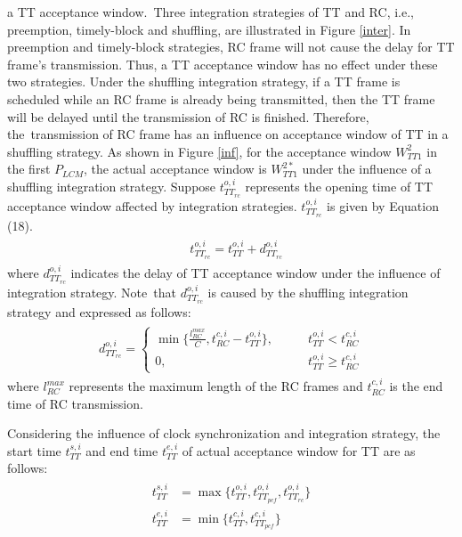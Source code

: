 \documentclass[electronics,article,accept,moreauthors,pdftex]{Definitions/mdpi}
\begin{document}
 a TT acceptance window.~Three integration strategies of TT and RC, i.e.,  preemption, timely-block and shuffling, are illustrated in {Figure} \ref{inter}. In preemption and timely-block strategies, RC frame will not cause the delay for TT frame's transmission. Thus, a TT acceptance window has no effect under these two strategies. Under the shuffling integration strategy, if a TT frame is scheduled while an RC frame is already being transmitted, then the TT frame will be delayed until the transmission of RC is finished. Therefore, the~transmission of RC frame has an influence on acceptance window of  TT in a shuffling strategy. As shown in {Figure} \ref{inf}, for the acceptance window $W^2_{TT1}$ in the first $P_{LCM}$, the actual acceptance window is $W^{2*}_{TT1}$ under the influence of a shuffling integration strategy. Suppose $t^{o,i}_{TT_{rc}}$ represents the opening time of TT acceptance window affected by integration strategies. $t^{o,i}_{TT_{rc}}$ is given by Equation (18).
\begin{gather}
\begin{align}
&	t^{o,i}_{TT_{rc}} = t^{o,i}_{TT} + d^{o,i}_{TT_{rc}}
\end{align}
\end{gather}
where $d^{o,i}_{TT_{rc}}$ indicates the delay of TT acceptance window under the influence of integration strategy. Note~that $d^{o,i}_{TT_{rc}}$ is caused by the shuffling integration strategy and expressed as follows:
\begin{gather}
\begin{align}
	d^{o,i}_{TT_{rc}}=\begin{cases}
	\min \{ \frac{l^{max}_{RC}}C, t^{c,i}_{RC}-t^{o,i}_{TT}\},
	\qquad &  t^{o,i}_{TT} < t^{c,i}_{RC}\\
	0, \qquad &  t^{o,i}_{TT} \geq t^{c,i}_{RC}
\end{cases}
\end{align}
\end{gather}
where $l^{max}_{RC}$ represents the maximum length of the RC frames and $t^{c,i}_{RC}$ is the end time of RC transmission.

Considering the influence of clock synchronization and integration strategy, the start time $t^{s,i}_{TT}$ and end time $t^{e,i}_{TT}$ of actual acceptance window for TT are as follows:
\begin{gather}
\begin{align}
	t^{s,i}_{TT} &= \max \{ t^{o,i}_{TT}, t^{o,i}_{TT_{pcf}}, t^{o,i}_{TT_{rc}} \}\\
	t^{e,i}_{TT} &= \min \{ t^{c,i}_{TT}, t^{c,i}_{TT_{pcf}} \}
\end{align}
\end{gather}
\end{document}
